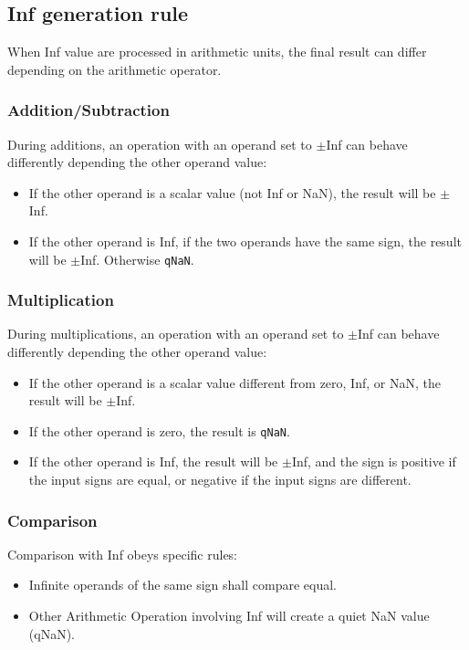 \subsection{Inf generation rule}

\label{sec:infgen}

When Inf value are processed in arithmetic units, the final result can differ depending on the arithmetic operator.

\subsubsection{Addition/Subtraction}

During additions, an operation with an operand set to $\pm$Inf can behave differently depending the other operand value:
\begin{itemize}[topsep=0pt]
    \item If the other operand is a scalar value (not Inf or NaN), the result will be $\pm$Inf.
    \item If the other operand is Inf, if the two operands have the same sign, the result will be $\pm$Inf. Otherwise \texttt{qNaN}.
\end{itemize}

\subsubsection{Multiplication}

During multiplications, an operation with an operand set to $\pm$Inf can behave differently depending the other operand value:
\begin{itemize}[topsep=0pt]
    \item If the other operand is a scalar value different from zero, Inf, or NaN, the result will be $\pm$Inf.
    \item If the other operand is zero, the result is \texttt{qNaN}.
    \item If the other operand is Inf, the result will be $\pm$Inf, and the sign is positive if the input signs are equal, or negative if the input signs are different.
\end{itemize}

\subsubsection{Comparison}
\label{sec:infcomp}

Comparison with Inf obeys specific rules:
\begin{itemize}[topsep=0pt]
    \item Infinite operands of the same sign shall compare equal.
    \item Other Arithmetic Operation involving Inf will create a quiet NaN value (qNaN).
\end{itemize}

